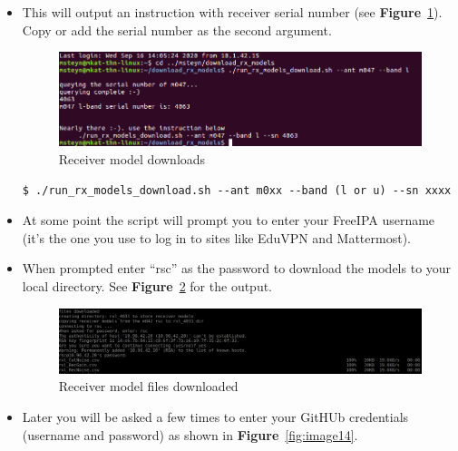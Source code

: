 \begin{itemize}
\begin{lstlisting}[style=DOS]
\end{lstlisting}


\item This will output an instruction with receiver serial number (see \textbf{Figure}~\ref{fig:image89}). Copy or add the serial number as the second argument.


\begin{figure}[!thb]
	\centering
	\includegraphics[scale=0.5]{Chapters/images/image89.png}
	
	\caption{Receiver model downloads}
	\label{fig:image89}
\end{figure}

\begin{lstlisting}[style=DOS]
$ ./run_rx_models_download.sh --ant m0xx --band (l or u) --sn xxxx

\end{lstlisting}


\item At some point the script will prompt you to enter your FreeIPA username (it’s the one you use to log in to sites like EduVPN and Mattermost).



\item When prompted enter “rsc” as the password to download the models to your local directory. See \textbf{Figure}~\ref{fig:image25} for the output.

\begin{figure}[!thb]
	\centering
	\includegraphics[scale=0.25]{Chapters/images/image25.png}
	
	\caption{Receiver model files downloaded}
	\label{fig:image25}
\end{figure}

\item Later you will be asked a few times to enter your GitHUb credentials (username and password)  as shown in \textbf{Figure}~\ref{fig:image14}.


\end{itemize}
